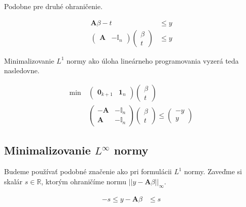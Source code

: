 \documentclass[12pt,oneside,a4paper,slovak]{article}
\begin{document}
Podobne pre druhé ohraničenie.

\begin{align*}
	\mathbf{A} \beta - t &\leq y \\
	\left(
		\begin{array}{c|c}
			\mathbf{A} & -\mathbb{I}_n
		\end{array}
	\right)
	\left(
		\begin{array}{c}
			\beta \\
			\hline
			t
		\end{array}
	\right) &\leq y
\end{align*}

Minimalizovanie $L^{1}$ normy ako úloha lineárneho programovania vyzerá teda nasledovne.

\begin{align*}
	\text{min}~ &
	\left(
		\begin{array}{c|c}
			\mathbf{0}_{k+1} & \mathbf{1}_n
		\end{array}
	\right)
	\left(
		\begin{array}{c}
			\beta \\
			\hline
			t
		\end{array}
	\right) \\
	&\left(
		\begin{array}{c|c}
			-\mathbf{A} & -\mathbb{I}_n \\
			\hline
			\mathbf{A} & -\mathbb{I}_n
		\end{array}
	\right)
	\left(
		\begin{array}{c}
			\beta \\
			\hline
			t
		\end{array}
	\right)
	\leq
	\left(
		\begin{array}{c}
			-y \\
			\hline
			y
		\end{array}
	\right)
\end{align*}

\newpage

\subsection*{Minimalizovanie $L^{\infty}$ normy}

Budeme používať podobné značenie ako pri formulácii $L^1$ normy. Zaveďme si skalár $s \in \mathbb{R}$, ktorým ohraničíme normu $||y - \mathbf{A} \beta||_{\infty}$.

\begin{align*}
	-s \leq y - \mathbf{A} \beta &\leq s
\end{align*}
\end{document}
